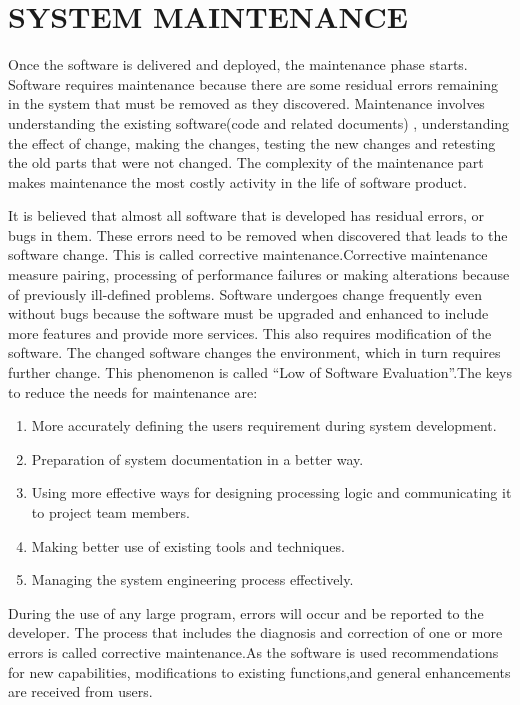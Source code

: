 \documentclass[a4paper,12pt]{article}
\begin{document}
\section{SYSTEM  MAINTENANCE}\vspace{5mm}
Once the software is delivered and deployed, the maintenance phase starts. Software requires maintenance because there are some residual errors remaining in the system that must be removed as they discovered. Maintenance involves understanding the existing software(code and related documents) , understanding the effect of change, making the changes, testing the new changes and retesting the old parts that were not changed. The complexity of the maintenance part makes maintenance the most costly activity in the life of software product.
\par\vspace{2mm}
 It is believed that almost all software that is developed has residual errors, or bugs in them. These errors need to be removed when discovered that leads to the software change. This is called corrective maintenance.Corrective maintenance measure pairing, processing of performance failures or making alterations because of previously ill-defined problems. Software undergoes change frequently even without bugs because the software must be upgraded and enhanced to include more features and  provide more services. This also requires modification of the software. The changed software changes the environment, which in turn requires further change. This phenomenon is called “Low of Software Evaluation”.The keys to reduce the needs for maintenance are:\par\vspace{2mm}
\begin{enumerate}
\item More accurately defining the users requirement during system development. 
\item Preparation of system documentation in a better way.
\item Using more effective ways for designing processing logic and communicating it to  project team members.
\item Making better use of existing tools and techniques.
\item Managing the system engineering process effectively.
\end{enumerate}
\par\vspace{2mm}
 During the use of any large program, errors will occur and be reported to the developer. The process that includes the diagnosis and correction of one or more errors is called corrective maintenance.As the software is used recommendations
for new capabilities, modifications to existing functions,and  general enhancements are received from users.
\newpage
\end{document}
